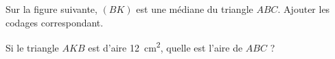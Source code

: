 
\begin{exercice}\label{exosmath-0929}

    Sur la figure suivante, \( (BK)\) est une médiane du triangle \( ABC\). Ajouter les codages correspondant.
\begin{center}
   
\end{center}

Si le triangle \( AKB\) est d'aire \SI{12}{\centi\meter\squared}, quelle est l'aire de \( ABC\) ?

\end{exercice}
